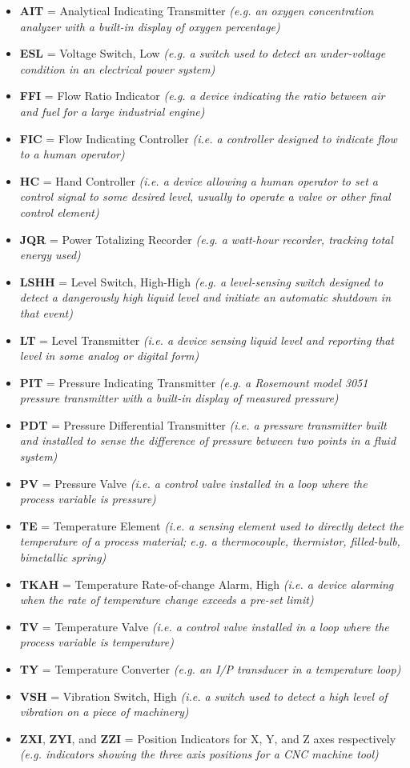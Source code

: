 \begin{itemize}
\item \textbf{AIT} = Analytical Indicating Transmitter \textit{(e.g. an oxygen concentration analyzer with a built-in display of oxygen percentage)}
\item \textbf{ESL} = Voltage Switch, Low \textit{(e.g. a switch used to detect an under-voltage condition in an electrical power system)}
\item \textbf{FFI} = Flow Ratio Indicator \textit{(e.g. a device indicating the ratio between air and fuel for a large industrial engine)}
\item \textbf{FIC} = Flow Indicating Controller \textit{(i.e. a controller designed to indicate flow to a human operator)}
\item \textbf{HC} = Hand Controller \textit{(i.e. a device allowing a human operator to set a control signal to some desired level, usually to operate a valve or other final control element)}
\item \textbf{JQR} = Power Totalizing Recorder \textit{(e.g. a watt-hour recorder, tracking total energy used)}
\item \textbf{LSHH} = Level Switch, High-High \textit{(e.g. a level-sensing switch designed to detect a dangerously high liquid level and initiate an automatic shutdown in that event)}
\item \textbf{LT} = Level Transmitter \textit{(i.e. a device sensing liquid level and reporting that level in some analog or digital form)}
\item \textbf{PIT} = Pressure Indicating Transmitter \textit{(e.g. a Rosemount model 3051 pressure transmitter with a built-in display of measured pressure)}
\item \textbf{PDT} = Pressure Differential Transmitter \textit{(i.e. a pressure transmitter built and installed to sense the difference of pressure between two points in a fluid system)}
\item \textbf{PV} = Pressure Valve \textit{(i.e. a control valve installed in a loop where the process variable is pressure)}
\item \textbf{TE} = Temperature Element \textit{(i.e. a sensing element used to directly detect the temperature of a process material; e.g. a thermocouple, thermistor, filled-bulb, bimetallic spring)}
\item \textbf{TKAH} = Temperature Rate-of-change Alarm, High \textit{(i.e. a device alarming when the rate of temperature change exceeds a pre-set limit)}
\item \textbf{TV} = Temperature Valve \textit{(i.e. a control valve installed in a loop where the process variable is temperature)}
\item \textbf{TY} = Temperature Converter \textit{(e.g. an I/P transducer in a temperature loop)}
\item \textbf{VSH} = Vibration Switch, High \textit{(i.e. a switch used to detect a high level of vibration on a piece of machinery)}
\item \textbf{ZXI}, \textbf{ZYI}, and \textbf{ZZI} = Position Indicators for X, Y, and Z axes respectively \textit{(e.g. indicators showing the three axis positions for a CNC machine tool)} 
\end{itemize}
